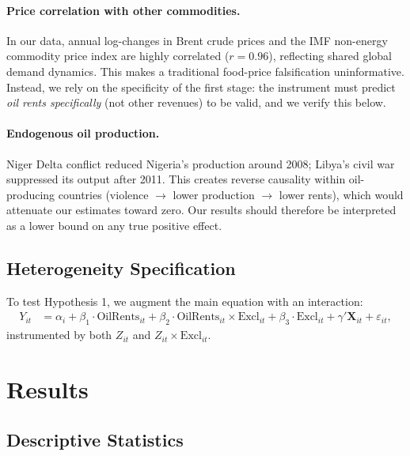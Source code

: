 \documentclass[12pt]{article}
\begin{document}
\paragraph{Price correlation with other commodities.}
In our data, annual log-changes in Brent crude prices and the IMF
non-energy commodity price index are highly correlated ($r = 0.96$),
reflecting shared global demand dynamics.
This makes a traditional food-price falsification uninformative.
Instead, we rely on the specificity of the first stage:
the instrument must predict \emph{oil rents specifically} (not other revenues)
to be valid, and we verify this below.

\paragraph{Endogenous oil production.}
Niger Delta conflict reduced Nigeria's production around 2008;
Libya's civil war suppressed its output after 2011.
This creates reverse causality within oil-producing countries
(violence $\to$ lower production $\to$ lower rents),
which would attenuate our estimates toward zero.
Our results should therefore be interpreted as a lower bound
on any true positive effect.

\subsection{Heterogeneity Specification}

To test Hypothesis 1, we augment the main equation with an interaction:
\begin{align}
  Y_{it} &= \alpha_i + \beta_1 \cdot \text{OilRents}_{it}
            + \beta_2 \cdot \text{OilRents}_{it} \times \text{Excl}_{it}
            + \beta_3 \cdot \text{Excl}_{it}
            + \gamma' \mathbf{X}_{it} + \varepsilon_{it},
\end{align}
instrumented by both $Z_{it}$ and $Z_{it} \times \text{Excl}_{it}$.

\section{Results}
\label{sec:results}

\subsection{Descriptive Statistics}
\end{document}
